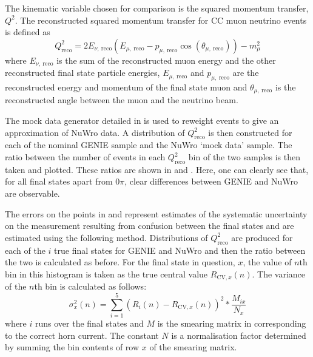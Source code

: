 The kinematic variable chosen for comparison is the squared momentum transfer, $Q^{2}$.
The reconstructed squared momentum transfer for CC muon neutrino events is defined as
\begin{equation}
Q^{2}_{\textrm{reco}} = 2E_{\nu,~\textrm{reco}} \left( E_{\mu,~\textrm{reco}} - p_{\mu,~\textrm{reco}} \cos \left( \theta_{\mu,~\textrm{reco}} \right) \right) - m_{\mu}^{2}
\end{equation}
where $E_{\nu,~\textrm{reco}}$ is the sum of the reconstructed muon energy and the other reconstructed final state particle energies, $E_{\mu,~\textrm{reco}}$ and $p_{\mu,~\textrm{reco}}$ are the reconstructed energy and momentum of the final state muon and $\theta_{\mu,~\textrm{reco}}$ is the reconstructed angle between the muon and the neutrino beam.

The mock data generator detailed in  is used to reweight events to give an approximation of NuWro data.
A distribution of $Q^{2}_{\textrm{reco}}$ is then constructed for each of the nominal GENIE sample and the NuWro `mock data' sample. 
The ratio between the number of events in each $Q^{2}_{\textrm{reco}}$ bin of the two samples is then taken and plotted. 
These ratios are shown in  and . 
Here, one can clearly see that, for all final states apart from $0\pi$, clear differences between GENIE and NuWro are observable.

The errors on the points in  and  represent estimates of the systematic uncertainty on the measurement resulting from confusion between the final states and are estimated using the following method.
Distributions of $Q^{2}_{\textrm{reco}}$ are produced for each of the $i$ true final states for GENIE and NuWro and then the ratio between the two is calculated as before.
For the final state in question, $x$, the value of $n$th bin in this histogram is taken as the true central value $R_{\textrm{CV}, x}(n)$.
The variance of the $n$th bin is calculated as follows:
\begin{equation}
	\sigma_{x}^{2}(n) = \sum_{i=1}^{5} \left( R_{i}(n) - R_{\textrm{CV}, x}(n) \right)^{2} * \frac{M_{i x}}{N_{x}}
\end{equation}
where $i$ runs over the final states and $M$ is the smearing matrix in  corresponding to the correct horn current.
The constant $N$ is a normalisation factor determined by summing the bin contents of row $x$ of the smearing matrix. 

